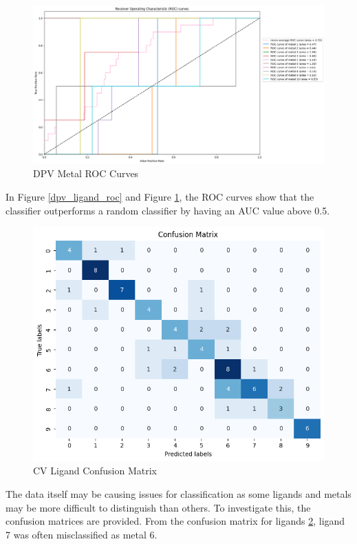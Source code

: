 \begin{figure}[h!]
  \centering
    \includegraphics[width=1.0\textwidth]{figures/dpv_metal_roc.png}
    \caption{DPV Metal ROC Curves}
    \label{dpv_metal_roc}
\end{figure}
In Figure \ref{dpv_ligand_roc} and Figure \ref{dpv_metal_roc}, the ROC curves show that the classifier outperforms a random classifier by having an AUC value above 0.5. 
\begin{figure}[h!]
  \centering
    \includegraphics[width=1.0\textwidth]{figures/cv_ligand_matrix.png}
    \caption{CV Ligand Confusion Matrix}
    \label{cv_ligand_matrix}
\end{figure}
The data itself may be causing issues for classification as some ligands and metals may be more difficult to distinguish than others. To investigate this, the confusion matrices are provided. 
From the confusion matrix for ligands \ref{cv_ligand_matrix}, ligand 7 was often misclassified as metal 6.
